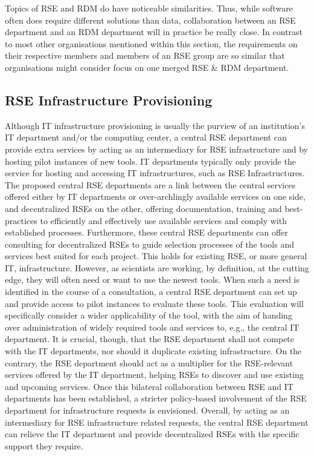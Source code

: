 \documentclass[a4paper]{article}
\begin{document}
Topics of RSE and RDM do have noticeable similarities.
Thus, while software often does require different solutions than data, collaboration between an RSE department and an RDM department will in practice be really close.
In contrast to most other organisations mentioned within this section,
the requirements on their respective members and members of an RSE group are so similar that organisations might consider focus on one merged RSE \& RDM department.

\subsection{RSE Infrastructure Provisioning}
\label{sec:infrastructure}

Although IT infrastructure provisioning is usually the purview of an institution's IT department and/or the computing center,
a central RSE department can provide extra services by acting as an intermediary for RSE infrastructure and by hosting pilot instances of new tools.
IT departments typically only provide the service for hosting and accessing IT infrastructures, such as RSE Infrastructures.
The proposed central RSE departments are a link between the central services offered either by IT departments or over-archlingly available services on one side,
and decentralized RSEs on the other, offering documentation, training and best-practices to efficiently and effectively use available services and comply with established processes.
Furthermore, these central RSE departments can offer consulting for decentralized RSEs to guide selection processes of the tools and services best suited for each project.
This holds for existing RSE, or more general IT, infrastructure.
However, as scientists are working, by definition, at the cutting edge, they will often need or want to use the newest tools.
When such a need is identified in the course of a consultation, a central RSE department can set up and provide access to pilot instances to evaluate these tools.
This evaluation will specifically consider a wider applicability of the tool, with the aim of handing over administration of widely required tools and services to, e.g., the central IT department.
It is crucial, though, that the RSE department shall not compete with the IT departments, nor should it duplicate existing infrastructure.
On the contrary, the RSE department should act as a multiplier for the RSE-relevant services offered by the IT department, helping RSEs to discover and use existing and upcoming services.
Once this bilateral collaboration between RSE and IT departments has been established, a stricter policy-based involvement of the RSE department for infrastructure requests is envisioned.
Overall, by acting as an intermediary for RSE infrastructure related requests, the central RSE department can relieve the IT department and provide decentralized RSEs with the specific support they require.
\end{document}
